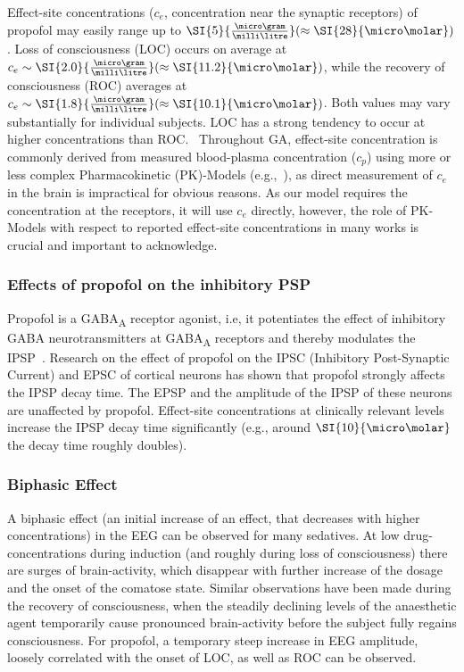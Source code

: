 Effect-site concentrations ($c_{e}$, concentration near the synaptic receptors) of propofol may easily range
up to $\SI{5}{\frac{\micro\gram}{\milli\litre}} (\approx\SI{28}{\micro\molar})$.
Loss of consciousness (LOC) occurs on average at $c_e \sim\SI{2.0}{\frac{\micro\gram}{\milli\litre}} (\approx\SI{11
.2}{\micro\molar})$,
while the recovery of consciousness (ROC) averages at $c_e \sim\SI{1.8}{\frac{\micro\gram}{\milli\litre}}
(\approx\SI{10.1}{\micro\molar})$.
Both values may vary substantially for individual subjects.
LOC has a strong tendency to occur at higher concentrations than ROC.~\cite{iwakiri_individual_2005,
    ferreira_patterns_2020}
Throughout GA, effect-site concentration is commonly derived from measured
blood-plasma concentration ($c_p$) using more or less complex Pharmacokinetic (PK)-Models
(e.g.,~\cite{eleveld_general_2014, liang_pharmacokinetics-neural_2015}),
as direct measurement of $c_{e}$ in the brain is impractical for obvious reasons.
As our model requires the concentration at the receptors, it will use $c_{e}$ directly, however,
the role of PK-Models with respect to reported effect-site concentrations in many works is crucial
and important to acknowledge.


\subsubsection{Effects of propofol on the inhibitory PSP}
Propofol is a GABA\textsubscript{A} receptor agonist, i.e, it potentiates the effect of inhibitory
GABA neurotransmitters at GABA\textsubscript{A} receptors and thereby modulates
the IPSP~\cite{sahinovic_clinical_2018}.
Research on the effect of propofol on the IPSC (Inhibitory Post-Synaptic Current) and EPSC
of cortical neurons has shown that propofol strongly affects the IPSP decay time.
The EPSP and the amplitude of the IPSP of these neurons are unaffected by propofol.
Effect-site concentrations at clinically relevant levels increase the IPSP decay time
significantly (e.g., around $\SI{10}{\micro\molar}$ the decay time roughly doubles).
\cite{kitamura_effects_2003, mcdougall_propofol_2008}


\subsubsection{Biphasic Effect}\label{subsubsec:biphasic-effect}
A biphasic effect (an initial increase of an effect, that decreases with higher concentrations) in the EEG can be
observed for many sedatives.
At low drug-concentrations during induction (and roughly during loss of consciousness)
there are surges of brain-activity,
which disappear with further increase of the dosage and the onset of the comatose state.
Similar observations have been made during the recovery of consciousness,
when the steadily declining levels of the anaesthetic agent temporarily cause pronounced brain-activity before the
subject fully regains consciousness.
For propofol, a temporary steep increase in EEG amplitude,
loosely correlated with the onset of LOC, as well as ROC can be observed.
\cite{kuizenga_quantitative_1998, kuizenga_biphasic_2001}


